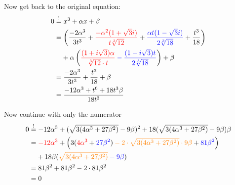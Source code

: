 Now get back to the original equation:
\begin{align}
    0 &\stackrel{!}{=} x^3 + \alpha x + \beta \\
       &= \left (\frac{-2 \alpha^3}{3 t^3}
        + \color{red}\frac{-\alpha^2(1+\sqrt{3}i)}{t\sqrt[3]{12}}\color{black}
        + \color{blue}\frac{\alpha t(1-\sqrt{3}i)}{2\sqrt[3]{18}}\color{black}
        + \frac{t^3}{18} \right )\\
    &\hphantom{{}=} + \alpha \left (\color{red}\frac{(1+i \sqrt{3})\alpha}{\sqrt[3]{12} \cdot t} \color{black}
     \color{blue}-\frac{(1-i\sqrt{3}) t}{2\sqrt[3]{18}} \color{black} \right ) + \beta\\
    &= \frac{-2 \alpha^3}{3 t^3}
    + \frac{t^3}{18}
    + \beta\\
    &= \frac{-12 \alpha^3 + t^6+18 t^3 \beta}{18t^3}
\end{align}

Now continue with only the numerator
\begin{align}
    0 &\stackrel{!}{=}
    - 12 \alpha^3 
    + (\sqrt{3(4 \alpha^3 + 27 \beta^2)}-9\beta)^2
    + 18 (\sqrt{3(4 \alpha^3 + 27 \beta^2)} - 9 \beta) \beta\\
    &= 
    \color{red}- 12 \alpha^3 \color{black}+
    \left (
        3(\color{red}4 \alpha^3\color{black} + \color{blue}27 \beta^2 \color{black})
        \color{orange}- 2 \cdot \sqrt{3(4 \alpha^3 + 27 \beta^2)} \cdot 9\beta\color{black}
        + \color{blue}81 \beta^2\color{black}
    \right )\\
    &\hphantom{{}=}+ 18 \beta (\color{orange}\sqrt{3(4 \alpha^3 + 27 \beta^2)}\color{black} \color{blue}- 9 \beta\color{black}) \\
    &= 81 \beta^2 + 81 \beta^2 - 2 \cdot 81 \beta^2\\
    &= 0
\end{align}
